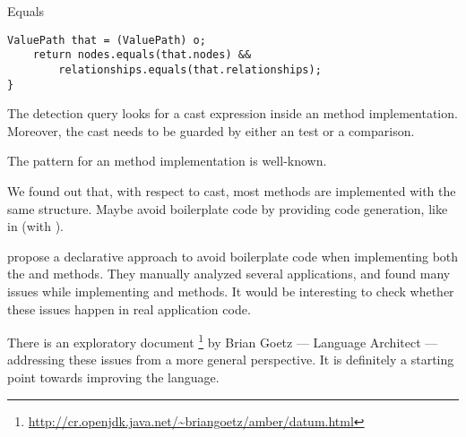 \begin{pattern}{Equals}
\begin{lstlisting}[style=java,label=lst:equals,caption=\pname{} pattern guarded by a \code{getClass} comparison]
    ValuePath that = (ValuePath) o;
    return nodes.equals(that.nodes) &&
        relationships.equals(that.relationships);
}
\end{lstlisting}

\detection

The detection query looks for a cast expression inside an
 method implementation.
Moreover, the cast needs to be guarded by either an
 test or a  comparison.

\discussion

The pattern for an  method implementation is well-known.


We found out that, with respect to cast,
most  methods are implemented with the same structure.
Maybe avoid boilerplate code by providing code generation,
like in \haskell{} (with ).

\cite{vaziriDeclarativeObjectIdentity2007} propose a declarative approach
to avoid boilerplate code when implementing both
the  and  methods.
They manually analyzed several applications,
and found many issues while implementing  and
 methods.
It would be interesting to check whether these issues happen in real
application code.

There is an exploratory document%
\footnote{\url{http://cr.openjdk.java.net/\~briangoetz/amber/datum.html}}
by Brian Goetz --- \java{} Language Architect ---
addressing these issues from a more general perspective.
It is definitely a starting point towards improving the \java{} language.


\end{pattern}
